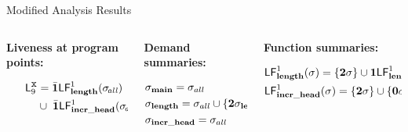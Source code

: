 \documentclass[xcolor=x11names,compress,mathserif]{beamer}
\renewcommand{\(}{\begin{columns}}
\renewcommand{\)}{\end{columns}}
\newcommand{\<}[1]{\begin{column}{#1}}
\renewcommand{\>}{\end{column}}
\begin{document}
\begin{frame}[t]{Modified Analysis Results}
  \scriptsize
  \begin{columns}[c]
    \begin{column}[T]{0.33\textwidth}
      \vspace*{1.5cm}
      \centerline{\bf Liveness at program points:}
      \begin{align*}
        \mathsf{L}_{{9}}^{\mbox{\tt x}}  &=  \bar{\mathbf{1}}\mathsf{LF}_{\mathit {\mathbf{length}}}^{1}( {\mathit \sigma_{\mathit{\!all}}}) \\
        \;\;\;\;\;\;\;\;\;\;  &\cup\; \bar{\mathbf{1}}\mathsf{LF}_{\mathit {\mathbf{incr\_head}}}^{1}( {\mathit \sigma_{\mathit{\!all}}})\\ 
      \end{align*}
    \end{column}
    \begin{column}[T]{0.33\textwidth}
      \vspace*{1.5cm}
      \centerline{\bf Demand summaries:}
      \begin{align*}
        &\sigma_{\mathbf{main}} = \sigma_{all}\\
        &\sigma_{\mathbf{length}} = \sigma_{all} \cup \{{\mathbf{2}}\sigma_{\mathbf{length}}\}\\
        &\sigma_{\mathbf{incr\_head}} = \sigma_{all}\\
      \end{align*}
    \end{column}
    
    \begin{column}[T]{0.33\textwidth}
      \vspace*{1.5cm}
      \centerline{\bf Function summaries:}
      \begin{align*}
        &\mathsf{LF}_{\mathit {\mathbf{length}}}^{1}( {\mathit \sigma}) = \{{\mathbf{2}}\sigma\} \cup \mathbf{1}\mathsf{LF}_{\mathit {\mathbf{length}}}^{1}( {\mathit {{\mathbf{2}}}\sigma})\\
        &\mathsf{LF}_{\mathit {\mathbf{incr\_head}}}^{1}( {\mathit \sigma}) = \{{\mathbf{2}}\sigma\} \cup \{\mathbf{0}\sigma\}\\
      \end{align*}
    \end{column}
  \end{columns}
\end{frame}
\end{document}
